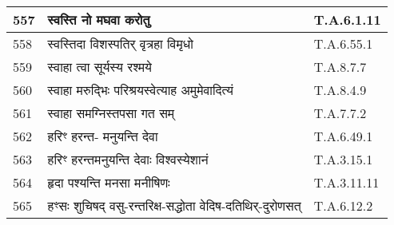 \documentclass[17pt]{extarticle}
\begin{document}
\begin{longtable}{||p{0.4in}||p{4.9in}||p{0.9in}||}
    \hline
        
    557 & स्वस्ति नो मघवा करोतु & T.A.6.1.11       \\
    
    \hline
        
    558 & स्वस्तिदा विशस्पतिर् वृत्रहा विमृधो & T.A.6.55.1       \\
    
    \hline
        
    559 & स्वाहा त्वा सूर्यस्य रश्मये & T.A.8.7.7       \\
    
    \hline
        
    560 & स्वाहा मरुद्भिः परिश्रयस्वेत्याह अमुमेवादित्यं & T.A.8.4.9       \\
    
    \hline
        
    561 & स्वाहा समग्निस्तपसा गत सम् & T.A.7.7.2       \\
    
    \hline
        
    562 & हरिꣳ हरन्त{-} मनुयन्ति देवा & T.A.6.49.1       \\
    
    \hline
        
    563 & हरिꣳ हरन्तमनुयन्ति देवाः विश्वस्येशानं & T.A.3.15.1       \\
    
    \hline
        
    564 & हृदा पश्यन्ति मनसा मनीषिणः & T.A.3.11.11       \\
    
    \hline
        
    565 & हꣳसः शुचिषद् वसु{-}रन्तरिक्ष{-}सद्धोता वेदिष{-}दतिथिर्{-}दुरोणसत् & T.A.6.12.2       \\
    
    \hline
        \bottomrule
  \end{longtable}
  
\end{document}
